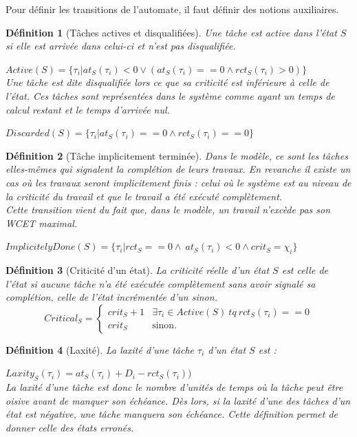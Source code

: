 \documentclass[a4paper]{report}
\theoremstyle{break}
\newtheorem{defin}{Définition}
\begin{document}
Pour définir les transitions de l'automate, il faut définir des notions auxiliaires.

\begin{defin}[Tâches actives et disqualifiées]
Une tâche est active dans l'état $S$ si elle est arrivée dans celui-ci et n'est pas disqualifiée.

$Active(S) = \{\tau_i | at_S(\tau_i) < 0\vee (at_S(\tau_i) == 0 \wedge rct_S(\tau_i) > 0)\}$\\

Une tâche est dite disqualifiée lors ce que sa criticité est inférieure à celle de l'état. Ces tâches sont représentées dans le système comme ayant un temps de calcul restant et le temps d'arrivée nul.

$Discarded(S) = \{\tau_i | at_S(\tau_i) == 0 \wedge rct_S(\tau_i) == 0\}$
\end{defin}


\begin{defin}[Tâche implicitement terminée]
Dans le modèle, ce sont les tâches elles-mêmes qui signalent la complétion de leurs travaux. En revanche il existe un cas où les travaux seront implicitement finis : celui où le système est au niveau de la criticité du travail et que le travail a été exécuté complètement.\\
Cette transition vient du fait que, dans le modèle, un travail n'excède pas son WCET maximal.

$ImplicitelyDone(S) = \{\tau_i | rct_S == 0 \wedge\ at_S(\tau_i) < 0\wedge crit_S=\chi_i\}$\\
\end{defin}


\begin{defin}[Criticité d'un état]
La criticité réelle d'un état $S$ est celle de l'état si aucune tâche n'a été exécutée complètement sans avoir signalé sa complétion, celle de l'état incrémentée d'un sinon.
$$
Critical_S = \left\{
    \begin{array}{ll}
        crit_S+1 & \exists \tau_i \in Active(S)\ tq\ rct_S(\tau_i) == 0 \\
        crit_S & \mbox{sinon.}
    \end{array}
\right.
$$
\end{defin}

\begin{defin}[Laxité]
La laxité d'une tâche $\tau_i$ d'un état $S$ est :

$Laxity_S(\tau_i) = at_S(\tau_i)  + D_i - rct_S(\tau_i))$\\

La laxité d'une tâche est donc le nombre d'unités de temps où la tâche peut être oisive avant de manquer son échéance. Dès lors, si la laxité d'une des tâches d'un état est négative, une tâche manquera son échéance. Cette définition permet de donner celle des états erronés.
\end{defin}
\end{document}
